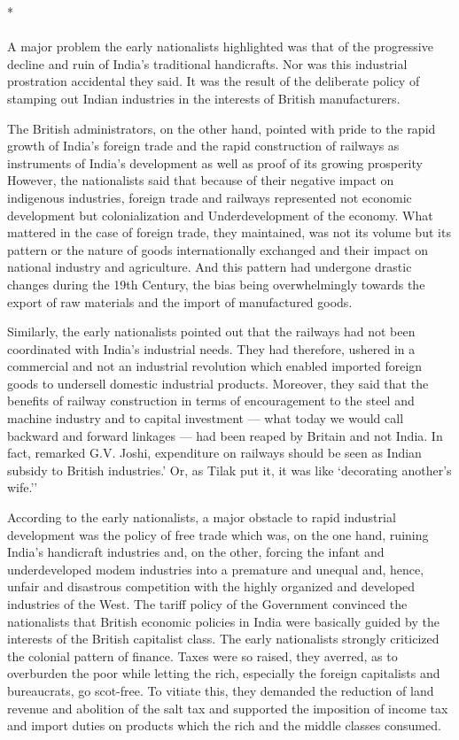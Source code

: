 \begin{center}*\end{center}

\paragraph*{}


A major problem the early nationalists highlighted was that of the progressive decline and ruin of India's traditional handicrafts. Nor was this industrial prostration accidental they said. It was the result of the deliberate policy of stamping out Indian industries in the interests of British manufacturers.

The British administrators, on the other hand, pointed with pride to the rapid growth of India's foreign trade and the rapid construction of railways as instruments of India's development as well as proof of its growing prosperity However, the nationalists said that because of their negative impact on indigenous industries, foreign trade and railways represented not economic development but colonialization and Underdevelopment of the economy. What mattered in the case of foreign trade, they maintained, was not its volume but its pattern or the nature of goods internationally exchanged and their impact on national industry and agriculture. And this pattern had undergone drastic changes during the 19th Century, the bias being overwhelmingly towards the export of raw materials and the import of manufactured goods.

Similarly, the early nationalists pointed out that the railways had not been coordinated with India's industrial needs. They had therefore, ushered in a commercial and not an industrial revolution which enabled imported foreign goods to undersell domestic industrial products. Moreover, they said that the benefits of railway construction in terms of encouragement to the steel and machine industry and to capital investment --- what today we would call backward and forward linkages --- had been reaped by Britain and not India. In fact, remarked G.V. Joshi, expenditure on railways should be seen as Indian subsidy to British industries.' Or, as Tilak put it, it was like `decorating another's wife.''

According to the early nationalists, a major obstacle to rapid industrial development was the policy of free trade which was, on the one hand, ruining India's handicraft industries and, on the other, forcing the infant and underdeveloped modem industries into a premature and unequal and, hence, unfair and disastrous competition with the highly organized and developed industries of the West. The tariff policy of the Government convinced the nationalists that British economic policies in India were basically guided by the interests of the British capitalist class. The early nationalists strongly criticized the colonial pattern of finance. Taxes were so raised, they averred, as to overburden the poor while letting the rich, especially the foreign capitalists and bureaucrats, go scot-free. To vitiate this, they demanded the reduction of land revenue and abolition of the salt tax and supported the imposition of income tax and import duties on products which the rich and the middle classes consumed.

